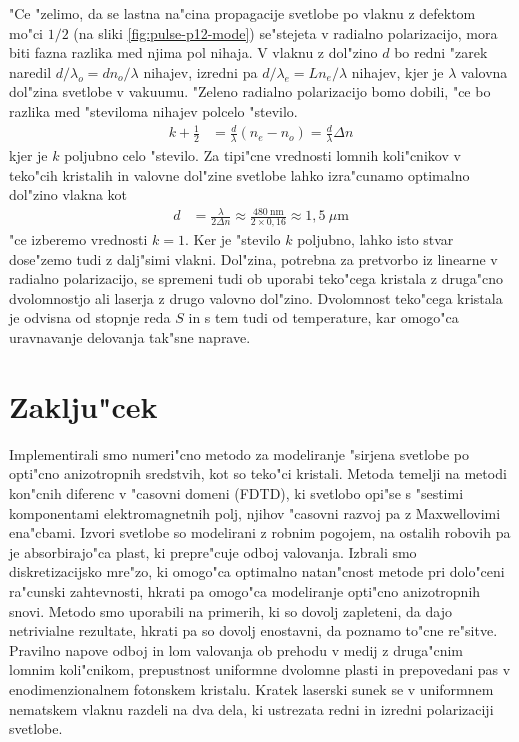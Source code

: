 \documentclass[12pt,twoside,openright,final]{report}
\begin{document}
"Ce "zelimo, da se lastna na"cina propagacije svetlobe po vlaknu z defektom mo"ci $1/2$ (na sliki \ref{fig:pulse-p12-mode}) se"stejeta v radialno polarizacijo, mora biti fazna razlika med njima pol nihaja. 
V vlaknu z dol"zino $d$ bo redni "zarek naredil $d/\lambda_o = d n_o/\lambda$ nihajev, izredni pa $d/\lambda_e = Ln_e/\lambda$ nihajev, kjer je $\lambda$ valovna dol"zina svetlobe v vakuumu. 
"Zeleno radialno polarizacijo bomo dobili, "ce bo razlika med "steviloma nihajev polcelo "stevilo. 
\begin{align}
  k + \frac{1}{2} &= \frac{d}{\lambda} \left( n_e - n_o \right) = \frac{d}{\lambda} \Delta n
\end{align}
kjer je $k$ poljubno celo "stevilo. Za tipi"cne vrednosti lomnih koli"cnikov v teko"cih kristalih in valovne dol"zine svetlobe lahko izra"cunamo optimalno dol"zino vlakna kot
\begin{align}
 d &= \frac{\lambda}{2\Delta n} \approx \frac{480~\mathrm{nm}}{2 \times 0,\!16} \approx 1,\!5~\mu\mathrm{m}
\end{align}
"ce izberemo vrednosti $k=1$. Ker je "stevilo $k$ poljubno, lahko isto stvar dose"zemo tudi z dalj"simi vlakni. 
Dol"zina, potrebna za pretvorbo iz linearne v radialno polarizacijo, se spremeni tudi ob uporabi teko"cega kristala z druga"cno dvolomnostjo ali laserja z drugo valovno dol"zino. 
Dvolomnost teko"cega kristala je odvisna od stopnje reda $S$ in s tem tudi od temperature, kar omogo"ca uravnavanje delovanja tak"sne naprave. 

\chapter{Zaklju"cek}

Implementirali smo numeri"cno metodo za modeliranje "sirjena svetlobe po opti"cno anizotropnih sredstvih, kot so teko"ci kristali. 
Metoda temelji na metodi kon"cnih diferenc v "casovni domeni (FDTD), ki svetlobo opi"se s "sestimi komponentami elektromagnetnih polj, njihov "casovni razvoj pa z Maxwellovimi ena"cbami. 
Izvori svetlobe so modelirani z robnim pogojem, na ostalih robovih pa je absorbirajo"ca plast, ki prepre"cuje odboj valovanja. 
Izbrali smo diskretizacijsko mre"zo, ki omogo"ca optimalno natan"cnost metode pri dolo"ceni ra"cunski zahtevnosti, hkrati pa omogo"ca modeliranje opti"cno anizotropnih snovi. 
Metodo smo uporabili na primerih, ki so dovolj zapleteni, da dajo netrivialne rezultate, hkrati pa so dovolj enostavni, da poznamo to"cne re"sitve. 
Pravilno napove odboj in lom valovanja ob prehodu v medij z druga"cnim lomnim koli"cnikom, prepustnost uniformne dvolomne plasti in prepovedani pas v enodimenzionalnem fotonskem kristalu. 
Kratek laserski sunek se v uniformnem nematskem vlaknu razdeli na dva dela, ki ustrezata redni in izredni polarizaciji svetlobe. 
\end{document}

